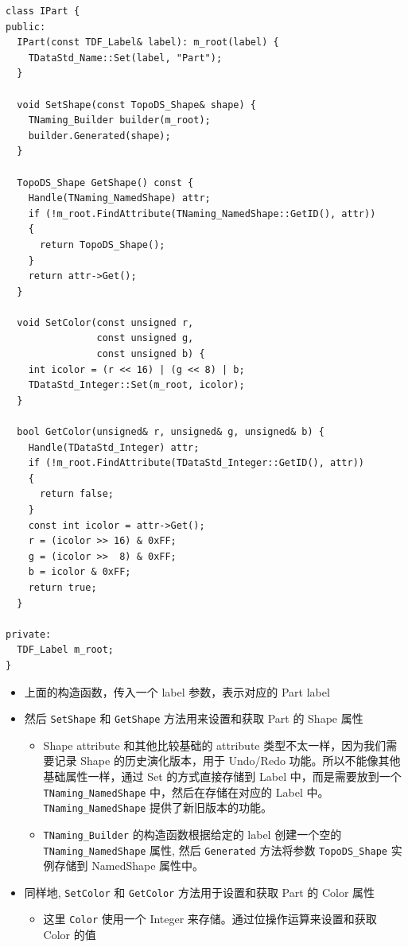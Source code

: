\documentclass[11pt]{article}
\begin{document}
\begin{verbatim}
class IPart {
public:
  IPart(const TDF_Label& label): m_root(label) {
    TDataStd_Name::Set(label, "Part");
  }

  void SetShape(const TopoDS_Shape& shape) {
    TNaming_Builder builder(m_root);
    builder.Generated(shape);
  }

  TopoDS_Shape GetShape() const {
    Handle(TNaming_NamedShape) attr;
    if (!m_root.FindAttribute(TNaming_NamedShape::GetID(), attr))
    {
      return TopoDS_Shape();
    }
    return attr->Get();
  }

  void SetColor(const unsigned r,
                const unsigned g,
                const unsigned b) {
    int icolor = (r << 16) | (g << 8) | b;
    TDataStd_Integer::Set(m_root, icolor);
  }

  bool GetColor(unsigned& r, unsigned& g, unsigned& b) {
    Handle(TDataStd_Integer) attr;
    if (!m_root.FindAttribute(TDataStd_Integer::GetID(), attr))
    {
      return false;
    }
    const int icolor = attr->Get();
    r = (icolor >> 16) & 0xFF;
    g = (icolor >>  8) & 0xFF;
    b = icolor & 0xFF;
    return true;
  }

private:
  TDF_Label m_root;
}
\end{verbatim}

\begin{itemize}
\item 上面的构造函数，传入一个 label 参数，表示对应的 Part label
\item 然后 \texttt{SetShape} 和 \texttt{GetShape} 方法用来设置和获取 Part 的 Shape 属性
\begin{itemize}
\item Shape attribute 和其他比较基础的 attribute 类型不太一样，因为我们需要记录 Shape 的历史演化版本，用于 Undo/Redo 功能。所以不能像其他基础属性一样，通过 Set 的方式直接存储到 Label 中，而是需要放到一个 \texttt{TNaming\_NamedShape} 中，然后在存储在对应的 Label 中。 \texttt{TNaming\_NamedShape} 提供了新旧版本的功能。
\item \texttt{TNaming\_Builder} 的构造函数根据给定的 label 创建一个空的 \texttt{TNaming\_NamedShape} 属性, 然后 \texttt{Generated} 方法将参数 \texttt{TopoDS\_Shape} 实例存储到 NamedShape 属性中。
\end{itemize}
\item 同样地, \texttt{SetColor}  和 \texttt{GetColor} 方法用于设置和获取 Part 的 Color 属性
\begin{itemize}
\item 这里 \texttt{Color} 使用一个 Integer 来存储。通过位操作运算来设置和获取 Color 的值
\end{itemize}
\end{itemize}
\end{document}
